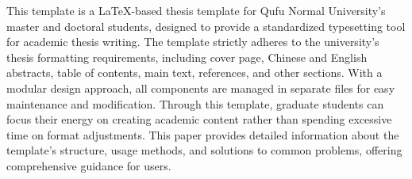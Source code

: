 This template is a \LaTeX{}-based thesis template for Qufu Normal University's master and doctoral students, designed to provide a standardized typesetting tool for academic thesis writing. The template strictly adheres to the university's thesis formatting requirements, including cover page, Chinese and English abstracts, table of contents, main text, references, and other sections. With a modular design approach, all components are managed in separate files for easy maintenance and modification. Through this template, graduate students can focus their energy on creating academic content rather than spending excessive time on format adjustments. This paper provides detailed information about the template's structure, usage methods, and solutions to common problems, offering comprehensive guidance for users.